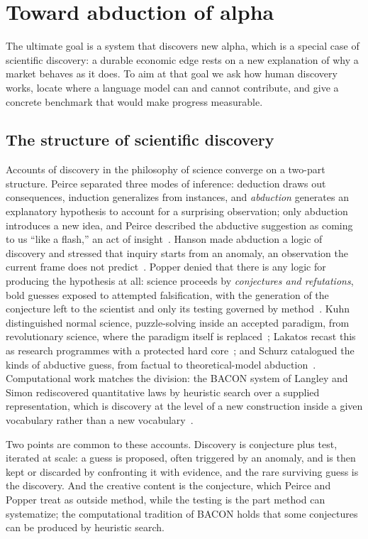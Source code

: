 \documentclass[11pt]{article}
\begin{document}
\section{Toward abduction of alpha}
\label{sec:abduction}

The ultimate goal is a system that discovers new alpha, which is a special case of scientific
discovery: a durable economic edge rests on a new explanation of why a market behaves as it does. To
aim at that goal we ask how human discovery works, locate where a language model can and cannot
contribute, and give a concrete benchmark that would make progress measurable.

\subsection{The structure of scientific discovery}
\label{sec:philsci}

Accounts of discovery in the philosophy of science converge on a two-part structure. Peirce separated
three modes of inference: deduction draws out consequences, induction generalizes from instances, and
\emph{abduction} generates an explanatory hypothesis to account for a surprising observation; only
abduction introduces a new idea, and Peirce described the abductive suggestion as coming to us
``like a flash,'' an act of insight~\cite{peirce}. Hanson made abduction a logic of discovery and stressed that inquiry starts
from an anomaly, an observation the current frame does not predict~\cite{hanson}. Popper denied that
there is any logic for producing the hypothesis at all: science proceeds by \emph{conjectures and
refutations}, bold guesses exposed to attempted falsification, with the generation of the conjecture
left to the scientist and only its testing governed by method~\cite{popper}. Kuhn distinguished normal
science, puzzle-solving inside an accepted paradigm, from revolutionary science, where the paradigm
itself is replaced~\cite{kuhn}; Lakatos recast this as research programmes with a protected hard
core~\cite{lakatos}; and Schurz catalogued the kinds of abductive guess, from factual to
theoretical-model abduction~\cite{schurz}. Computational work matches the division: the BACON system of
Langley and Simon rediscovered quantitative laws by heuristic search over a supplied representation,
which is discovery at the level of a new construction inside a given vocabulary rather than a new
vocabulary~\cite{bacon}.

Two points are common to these accounts. Discovery is conjecture plus test, iterated at scale: a guess is proposed, often
triggered by an anomaly, and is then kept or discarded by confronting it with evidence, and the rare
surviving guess is the discovery. And the creative content is the conjecture, which Peirce and Popper treat as
outside method, while the testing is the part method can systematize; the computational tradition of
BACON holds that some conjectures can be produced by heuristic search.
\end{document}
